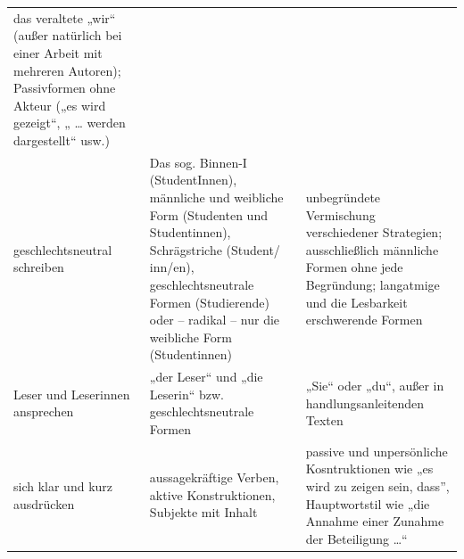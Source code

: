 \documentclass[]{book}
\theoremstyle{definition}
\theoremstyle{definition}
\theoremstyle{definition}
\theoremstyle{remark}
\begin{document}
\begin{longtable}[]{@{}lll@{}}
\begin{minipage}[t]{0.39\columnwidth}
das veraltete „wir`` (außer natürlich bei einer Arbeit mit mehreren
Autoren); Passivformen ohne Akteur („es wird gezeigt``, „ \ldots{}
werden dargestellt`` usw.) \vspace{-6mm}\strut
\end{minipage}\tabularnewline
\begin{minipage}[t]{0.11\columnwidth}\raggedright\strut
geschlechtsneutral schreiben\strut
\end{minipage} & \begin{minipage}[t]{0.42\columnwidth}\raggedright\strut
Das sog. Binnen-I (StudentInnen), männliche und weibliche Form
(Studenten und Studentinnen), Schrägstriche (Student/ inn/en),
geschlechtsneutrale Formen (Studierende) oder -- radikal -- nur die
weibliche Form (Studentinnen)\strut
\end{minipage} & \begin{minipage}[t]{0.39\columnwidth}\raggedright\strut
unbegründete Vermischung verschiedener Strategien; ausschließlich
männliche Formen ohne jede Begründung; langatmige und die Lesbarkeit
erschwerende Formen \vspace{-6mm}\strut
\end{minipage}\tabularnewline
\begin{minipage}[t]{0.11\columnwidth}\raggedright\strut
Leser und Leserinnen ansprechen\strut
\end{minipage} & \begin{minipage}[t]{0.42\columnwidth}\raggedright\strut
„der Leser`` und „die Leserin`` bzw. geschlechtsneutrale Formen\strut
\end{minipage} & \begin{minipage}[t]{0.39\columnwidth}\raggedright\strut
„Sie`` oder „du``, außer in handlungsanleitenden Texten
\vspace{-6mm}\strut
\end{minipage}\tabularnewline
\begin{minipage}[t]{0.11\columnwidth}\raggedright\strut
sich klar und kurz ausdrücken\strut
\end{minipage} & \begin{minipage}[t]{0.42\columnwidth}\raggedright\strut
aussagekräftige Verben, aktive Konstruktionen, Subjekte mit Inhalt\strut
\end{minipage} & \begin{minipage}[t]{0.39\columnwidth}\raggedright\strut
passive und unpersönliche Kosntruktionen wie „es wird zu zeigen sein,
dass'', Hauptwortstil wie „die Annahme einer Zunahme der Beteiligung
\ldots{}`` \vspace{-6mm}\strut

\end{minipage}
\end{longtable}
\end{document}
